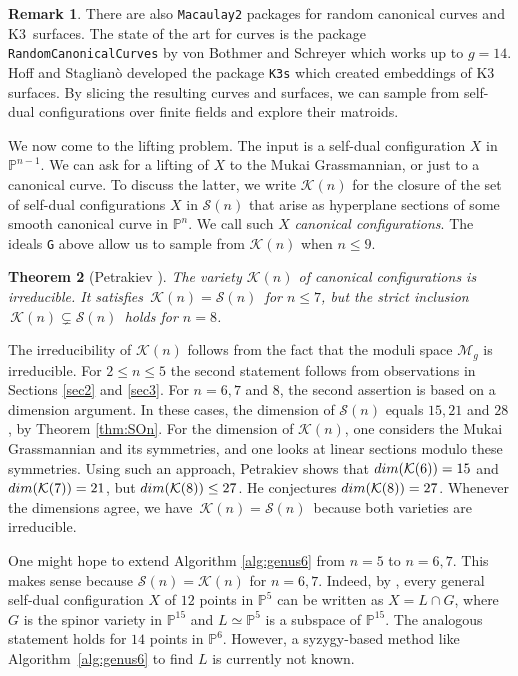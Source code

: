 \documentclass[12pt]{extarticle}
\newtheorem{theorem}{Theorem}
\theoremstyle{definition}
\newtheorem{remark}[theorem]{Remark}
\numberwithin{theorem}{section}
\theoremstyle{plain}\newtheorem{ithm}{Theorem}
\newcommand{\PP}{\mathbb{P}}
\begin{document}
\begin{remark}
There are also {\tt Macaulay2} packages for 
 random canonical curves and K3~surfaces.
 The state of the art for curves is
the package {\tt RandomCanonicalCurves}
by von Bothmer and Schreyer which works up to $g=14$.
Hoff and Staglian\` o \cite{HS} developed the package
{\tt K3s} which created embeddings of K3 surfaces.
By slicing the resulting curves and surfaces, we  can sample from
self-dual configurations over finite fields and explore their matroids.
\end{remark}


We now come to the lifting problem. The input is a self-dual configuration $X$ in $\PP^{n-1}$.
We can ask for a lifting of $X$
 to the Mukai Grassmannian, or just to a
canonical curve. To discuss the latter, we write
 $\mathcal{K}(n)$ for the closure of the set of self-dual configurations $X$
 in $\mathcal{S}(n)$
that arise as hyperplane sections
 of some smooth canonical curve
in $\PP^n$.
We call such $X$ {\em canonical configurations}.
The ideals {\tt G} above allow us to
sample from  $\mathcal{K}(n)$
when $n \leq 9$.

\begin{theorem}[Petrakiev \cite{Pet}] \label{thm:petr}
The variety $\mathcal{K}(n)$ of canonical configurations is irreducible.
It satisfies $\,\mathcal{K}(n) = \mathcal{S}(n)\,$ for $n \leq 7$,
but the strict inclusion $\,\mathcal{K}(n) \subsetneq \mathcal{S}(n)\,$ holds for $n = 8$.
\end{theorem}

The irreducibility of $\mathcal{K}(n)$ follows from the fact that
the moduli space $\mathcal{M}_g$ is irreducible. 
For $2\leq n\leq 5$ the second statement follows from observations in Sections \ref{sec2} and \ref{sec3}.
For $n=6,7 $ and $8$, the second assertion
is based on a dimension argument. In these cases,
the dimension of $\mathcal{S}(n)$ equals $15,21$ and $28$, by Theorem \ref{thm:SOn}.
For the dimension of $\mathcal{K}(n)$, one considers the Mukai Grassmannian
and its symmetries, and one looks at linear sections modulo these symmetries.
Using such an approach, Petrakiev \cite{Pet} shows that
${\rm dim}(\mathcal{K}(6)) =  15$ and ${\rm dim}(\mathcal{K}(7)) = 21$, but
 ${\rm dim}(\mathcal{K}(8)) \leq 27$. 
  He conjectures  ${\rm dim}(\mathcal{K}(8)) = 27$.
  Whenever the dimensions agree, we have
    $\,\mathcal{K}(n) = \mathcal{S}(n)\,$ 
  because both varieties are irreducible.

One might hope to
extend Algorithm \ref{alg:genus6}
from $n=5$ to $n=6,7$. This makes sense because
$\mathcal{S}(n) = \mathcal{K}(n)$ for $n=6,7$.
Indeed, by \cite[Theorem 2.6]{Pet},
every general self-dual configuration
$X$ of $12$ points in  $\PP^5$ can be
written as $X = L \cap G$,
where $G$ is the spinor variety in $\PP^{15}$
and $L \simeq \PP^5$ is a subspace of $\PP^{15}$.
The analogous statement holds for $14$ points in $\PP^6$.
However, a syzygy-based method like Algorithm~\ref{alg:genus6} to find $L$ is currently not known.
\end{document}
